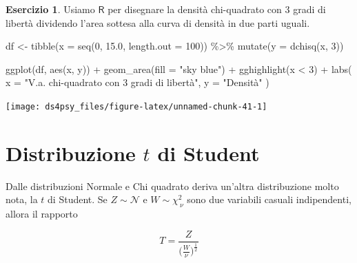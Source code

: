 \documentclass[
  11pt,
]{krantz}
\makeatletter
\newenvironment{Shaded}{\begin{snugshade}}{\end{snugshade}}
\newcommand{\AttributeTok}[1]{\textcolor[rgb]{0.61,0.61,0.61}{#1}}
\newcommand{\DecValTok}[1]{\textcolor[rgb]{0.06,0.06,0.06}{#1}}
\newcommand{\FloatTok}[1]{\textcolor[rgb]{0.06,0.06,0.06}{#1}}
\newcommand{\FunctionTok}[1]{\textcolor[rgb]{0,0,0}{#1}}
\newcommand{\NormalTok}[1]{#1}
\newcommand{\OtherTok}[1]{\textcolor[rgb]{0.37,0.37,0.37}{#1}}
\newcommand{\SpecialCharTok}[1]{\textcolor[rgb]{0,0,0}{#1}}
\newcommand{\StringTok}[1]{\textcolor[rgb]{0.5,0.5,0.5}{#1}}
\newenvironment{kframe}{%
\medskip{}
\setlength{\fboxsep}{.8em}
 \def\at@end@of@kframe{}%
 \ifinner\ifhmode%
  \def\at@end@of@kframe{\end{minipage}}%
  \begin{minipage}{\columnwidth}%
 \fi\fi%
 \def\FrameCommand##1{\hskip\@totalleftmargin \hskip-\fboxsep
 \colorbox{shadecolor}{##1}\hskip-\fboxsep
     \hskip-\linewidth \hskip-\@totalleftmargin \hskip\columnwidth}%
 \MakeFramed {\advance\hsize-\width
   \@totalleftmargin\z@ \linewidth\hsize
   \@setminipage}}%
 {\par\unskip\endMakeFramed%
 \at@end@of@kframe}
\renewenvironment{Shaded}{\begin{kframe}}{\end{kframe}}
\newcommand{\R}{\textsf{R}} %
\theoremstyle{definition}
\theoremstyle{definition}
\theoremstyle{definition}
\newtheorem{exercise}{Esercizio}[chapter]
\theoremstyle{definition}
\theoremstyle{remark}
\makeatother
\begin{document}
\begin{exercise}

Usiamo \(\R\) per disegnare la densità chi-quadrato con 3 gradi di libertà dividendo l'area sottesa alla curva di densità in due parti uguali.

\begin{Shaded}
\begin{Highlighting}[]
\NormalTok{df }\OtherTok{\textless{}{-}} \FunctionTok{tibble}\NormalTok{(}\AttributeTok{x =} \FunctionTok{seq}\NormalTok{(}\DecValTok{0}\NormalTok{, }\FloatTok{15.0}\NormalTok{, }\AttributeTok{length.out =} \DecValTok{100}\NormalTok{)) }\SpecialCharTok{\%\textgreater{}\%}
  \FunctionTok{mutate}\NormalTok{(}\AttributeTok{y =} \FunctionTok{dchisq}\NormalTok{(x, }\DecValTok{3}\NormalTok{))}

\FunctionTok{ggplot}\NormalTok{(df, }\FunctionTok{aes}\NormalTok{(x, y)) }\SpecialCharTok{+}
  \FunctionTok{geom\_area}\NormalTok{(}\AttributeTok{fill =} \StringTok{"sky blue"}\NormalTok{) }\SpecialCharTok{+}
  \FunctionTok{gghighlight}\NormalTok{(x }\SpecialCharTok{\textless{}} \DecValTok{3}\NormalTok{) }\SpecialCharTok{+}
  \FunctionTok{labs}\NormalTok{(}
    \AttributeTok{x =} \StringTok{"V.a. chi{-}quadrato con 3 gradi di libertà"}\NormalTok{,}
    \AttributeTok{y =} \StringTok{"Densità"}
\NormalTok{  )}
\end{Highlighting}
\end{Shaded}

\begin{center}\texttt{[image: ds4psy\_files/figure-latex/unnamed-chunk-41-1]} \end{center}

\end{exercise}

\hypertarget{distribuzione-t-di-student}{%
\section{\texorpdfstring{Distribuzione \(t\) di Student}{Distribuzione t di Student}}\label{distribuzione-t-di-student}}

Dalle distribuzioni Normale e Chi quadrato deriva un'altra distribuzione molto nota, la \(t\) di Student. Se \(Z \sim \mathcal{N}\) e \(W \sim \chi^2_{~\nu}\) sono due variabili casuali indipendenti, allora il rapporto

\begin{equation}
T = \frac{Z}{\Big( \frac{W}{\nu}\Big)^{\frac{1}{2}}}
\end{equation}
\end{document}
